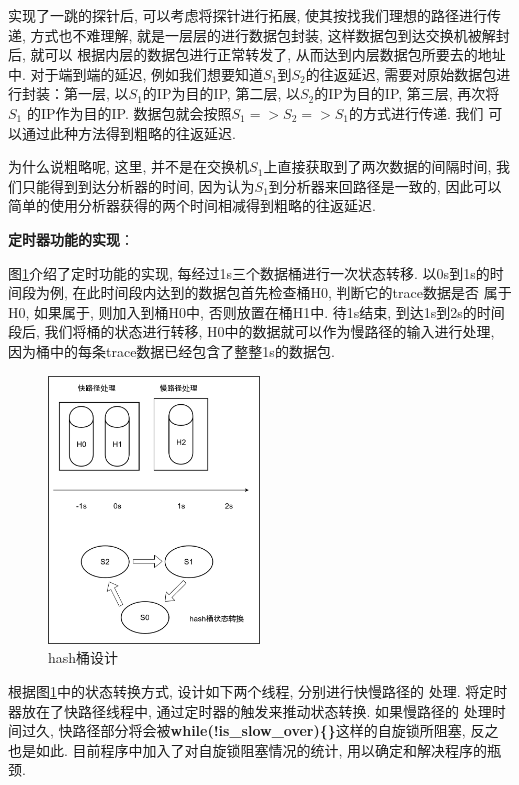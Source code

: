 实现了一跳的探针后, 可以考虑将探针进行拓展,
使其按找我们理想的路径进行传递, 方式也不难理解,
就是一层层的进行数据包封装, 这样数据包到达交换机被解封后, 就可以
根据内层的数据包进行正常转发了, 从而达到内层数据包所要去的地址中.
对于端到端的延迟, 例如我们想要知道\(S_{1}\)到\(S_{2}\)的往返延迟,
需要对原始数据包进行封装：第一层, 以\(S_{1}\)的IP为目的IP, 第二层,
以\(S_{2}\)的IP为目的IP, 第三层, 再次将\(S_{1}\) 的IP作为目的IP.
数据包就会按照\(S_{1} => S_{2} => S_{1}\)的方式进行传递. 我们
可以通过此种方法得到粗略的往返延迟.

为什么说粗略呢, 这里,
并不是在交换机\(S_{1}\)上直接获取到了两次数据的间隔时间,
我们只能得到到达分析器的时间, 因为认为\(S_{1}\)到分析器来回路径是一致的,
因此可以 简单的使用分析器获得的两个时间相减得到粗略的往返延迟.

\textbf{定时器功能的实现}：

图\ref{fig:hash_backet}介绍了定时功能的实现, 每经过1s三个数据桶进行一次状态转移.
以0s到1s的时间段为例, 在此时间段内达到的数据包首先检查桶H0, 判断它的trace数据是否
属于H0, 如果属于, 则加入到桶H0中, 否则放置在桶H1中. 待1s结束, 到达1s到2s的时间段后,
我们将桶的状态进行转移, H0中的数据就可以作为慢路径的输入进行处理,
因为桶中的每条trace数据已经包含了整整1s的数据包.

\begin{figure}[htbp!]
  \centering
  \includegraphics[width=0.5\textwidth]{../img/hash_backet.png}
  \caption{hash桶设计}
  \label{fig:hash_backet}
\end{figure}


  根据图\ref{fig:hash_backet}中的状态转换方式, 设计如下两个线程, 分别进行快慢路径的
处理. 将定时器放在了快路径线程中, 通过定时器的触发来推动状态转换. 如果慢路径的
处理时间过久, 快路径部分将会被\textbf{while(!is\_slow\_over)\{\}}这样的自旋锁所阻塞,
反之也是如此. 目前程序中加入了对自旋锁阻塞情况的统计, 用以确定和解决程序的瓶颈.

